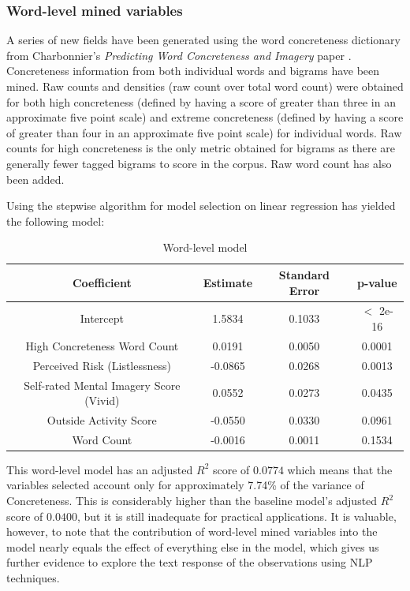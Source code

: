 \documentclass[12pt, a4paper]{article}
\begin{document}
\subsubsection{Word-level mined variables}
A series of new fields have been generated using the word concreteness dictionary from Charbonnier's \textit{Predicting Word Concreteness and Imagery} paper \cite{charbonnier-wartena-2019-predicting}. Concreteness information from both individual words and bigrams have been mined. Raw counts and densities (raw count over total word count) were obtained for both high concreteness (defined by having a score of greater than three in an approximate five point scale) and extreme concreteness (defined by having a score of greater than four in an approximate five point scale) for individual words. Raw counts for high concreteness is the only metric obtained for bigrams as there are generally fewer tagged bigrams to score in the corpus. Raw word count has also been added.

Using the stepwise algorithm for model selection on linear regression has yielded the following model:

\begin{table}[ht]
\centering
\begin{tabular}{||c c c c||} 
 \hline
 Coefficient & Estimate & Standard Error & p-value \\ [0.5ex] 
 \hline\hline
 Intercept & 1.5834 & 0.1033 & $<$ 2e-16 \\ 
 High Concreteness Word Count\footnotemark & 0.0191 & 0.0050 & 0.0001 \\
 Perceived Risk (Listlessness) & -0.0865 & 0.0268 & 0.0013 \\
 Self-rated Mental Imagery Score (Vivid)  & 0.0552 & 0.0273 & 0.0435 \\
 Outside Activity Score & -0.0550 & 0.0330 & 0.0961 \\ 
 Word Count  & -0.0016 & 0.0011 & 0.1534 \\ [1ex] 
 \hline
\end{tabular}
\caption{Word-level model}
\label{table:2}
\end{table}

This word-level model has an adjusted $R^2$ score of $0.0774$ which means that the variables selected account only for approximately 7.74\% of the variance of Concreteness. This is considerably higher than the baseline model's adjusted $R^2$ score of $0.0400$, but it is still inadequate for practical applications. It is valuable, however, to note that the contribution of word-level mined variables into the model nearly equals the effect of everything else in the model, which gives us further evidence to explore the text response of the observations using NLP techniques.
 
\end{document}
